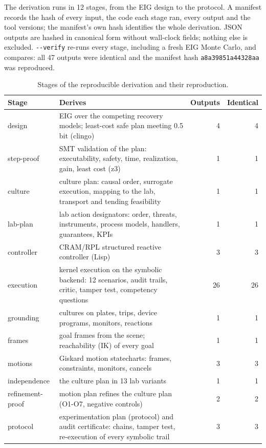\documentclass[10pt,a4paper]{article}
\begin{document}
The derivation runs in 12 stages, from the EIG design to the protocol. A manifest records the hash of every input, the code each stage ran, every output and the tool versions; the manifest's own hash identifies the whole derivation. JSON outputs are hashed in canonical form without wall-clock fields; nothing else is excluded. \texttt{-\allowbreak{}-\allowbreak{}verify} re-runs every stage, including a fresh EIG Monte Carlo, and compares: all 47 outputs were identical and the manifest hash \texttt{a8a39851a44328aa} was reproduced.

\begin{table}[tbp]\centering\small
\caption{Stages of the reproducible derivation and their reproduction.}\label{tab:repro}
\begin{tabularx}{\linewidth}{lXrr}\toprule
\textbf{Stage} & \textbf{Derives} & \textbf{Outputs} & \textbf{Identical} \\\midrule
design & EIG over the competing recovery models; least-cost safe plan meeting 0.5 bit (clingo) & 4 & 4 \\
step-proof & SMT validation of the plan: executability, safety, time, realization, gain, least cost (z3) & 1 & 1 \\
culture & culture plan: causal order, surrogate execution, mapping to the lab, transport and tending feasibility & 1 & 1 \\
lab-plan & lab action designators: order, threats, instruments, process models, handlers, guarantees, KPIs & 1 & 1 \\
controller & CRAM/RPL structured reactive controller (Lisp) & 3 & 3 \\
execution & kernel execution on the symbolic backend: 12 scenarios, audit trails, critic, tamper test, competency questions & 26 & 26 \\
grounding & cultures on plates, trips, device programs, monitors, reactions & 1 & 1 \\
frames & goal frames from the scene; reachability (IK) of every goal & 1 & 1 \\
motions & Giskard motion statecharts: frames, constraints, monitors, cancels & 3 & 3 \\
independence & the culture plan in 13 lab variants & 1 & 1 \\
refinement-proof & motion plan refines the culture plan (O1-O7, negative controls) & 2 & 2 \\
protocol & experimentation plan (protocol) and audit certificate: chains, tamper test, re-execution of every symbolic trail & 3 & 3 \\\bottomrule
\end{tabularx}
\end{table}
\end{document}
